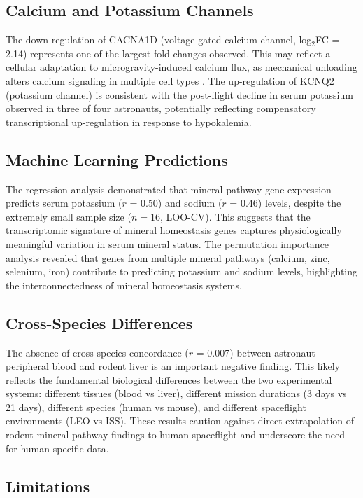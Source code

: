 \documentclass[11pt,a4paper]{article}
\begin{document}
\subsection{Calcium and Potassium Channels}

The down-regulation of CACNA1D (voltage-gated calcium channel, log$_2$FC = $-$2.14) represents one of the largest fold changes observed. This may reflect a cellular adaptation to microgravity-induced calcium flux, as mechanical unloading alters calcium signaling in multiple cell types \citep{hughesfulford2002}. The up-regulation of KCNQ2 (potassium channel) is consistent with the post-flight decline in serum potassium observed in three of four astronauts, potentially reflecting compensatory transcriptional up-regulation in response to hypokalemia.

\subsection{Machine Learning Predictions}

The regression analysis demonstrated that mineral-pathway gene expression predicts serum potassium ($r$ = 0.50) and sodium ($r$ = 0.46) levels, despite the extremely small sample size ($n=16$, LOO-CV). This suggests that the transcriptomic signature of mineral homeostasis genes captures physiologically meaningful variation in serum mineral status. The permutation importance analysis revealed that genes from multiple mineral pathways (calcium, zinc, selenium, iron) contribute to predicting potassium and sodium levels, highlighting the interconnectedness of mineral homeostasis systems.

\subsection{Cross-Species Differences}

The absence of cross-species concordance ($r$ = 0.007) between astronaut peripheral blood and rodent liver is an important negative finding. This likely reflects the fundamental biological differences between the two experimental systems: different tissues (blood vs liver), different mission durations (3 days vs 21 days), different species (human vs mouse), and different spaceflight environments (LEO vs ISS). These results caution against direct extrapolation of rodent mineral-pathway findings to human spaceflight and underscore the need for human-specific data.

\subsection{Limitations}
\end{document}
